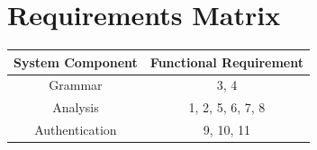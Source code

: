 \section{Requirements Matrix}
\begin{center}
    \begin{tabular}{|c|c|}
        \hline
        System Component & Functional Requirement \\
        \hline\hline
        Grammar          & 3, 4                   \\
        \hline
        Analysis         & 1, 2, 5, 6, 7, 8       \\
        \hline
        Authentication   & 9, 10, 11              \\
        \hline
    \end{tabular}
\end{center}
